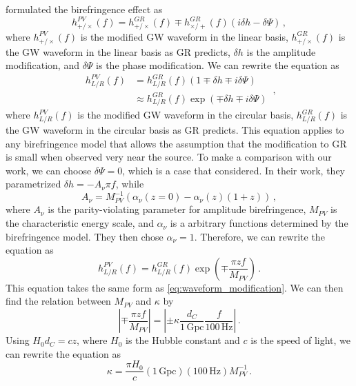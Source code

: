 \documentclass[aps,prd,twocolumn,superscriptaddress,preprintnumbers,floatfix,nofootinbib]{revtex4-2}
\begin{document}
\citet{Wang_2021} formulated the birefringence effect as
\begin{equation}
    h_{+/\times}^{PV}(f) = h_{+/\times}^{GR}(f)\mp h_{\times/+}^{GR}(f)(i\delta h-\delta\Psi)\,,
\end{equation}
where $h_{+/\times}^{PV}(f)$ is the modified \ac{GW} waveform in the linear basis, $h_{+/\times}^{GR}(f)$ is the \ac{GW} waveform in the linear basis as \ac{GR} predicts, $\delta h$ is the amplitude modification, and $\delta\Psi$ is the phase modification.
We can rewrite the equation as
\begin{equation}
\begin{split}
    h_{L/R}^{PV}(f)&=h_{L/R}^{GR}(f)(1\mp\delta h\mp i\delta\Psi)\\
    &\approx h_{L/R}^{GR}(f)\exp\left(\mp\delta h\mp i\delta\Psi\right)
\end{split}
\,,
\end{equation}
where $h_{L/R}^{PV}(f)$ is the modified \ac{GW} waveform in the circular basis, $h_{L/R}^{GR}(f)$ is the \ac{GW} waveform in the circular basis as \ac{GR} predicts.
This equation applies to any birefringence model that allows the assumption that the modification to \ac{GR} is small when observed very near the source.
To make a comparison with our work, we can choose $\delta\Psi=0$, which is a case that \citet{Wang_2021} considered.
In their work, they parametrized $\delta h=-A_\nu\pi f$, while
\begin{equation}
    A_\nu=M_{PV}^{-1}(\alpha_\nu(z=0)-\alpha_\nu(z)(1+z))\,,
\end{equation}
where $A_\nu$ is the parity-violating parameter for amplitude birefringence, $M_{PV}$ is the characteristic energy scale, and $\alpha_\nu$ is a arbitrary functions determined by the birefringence model.
They then chose $\alpha_\nu=1$.
Therefore, we can rewrite the equation as
\begin{equation}
    h_{L/R}^{PV}(f)= h_{L/R}^{GR}(f)\exp\left(\mp\frac{\pi zf}{M_{PV}}\right)\,.
\end{equation}
This equation takes the same form as \eqref{eq:waveform_modification}.
We can then find the relation between $M_{PV}$ and $\kappa$ by
\begin{equation}
    \left|\mp\frac{\pi zf}{M_{PV}}\right|=\left|\pm\kappa\frac{d_C}{1\,\mathrm{Gpc}}\frac{f}{100\,\mathrm{Hz}}\right|\,.
\end{equation}
Using $H_0d_C=cz$, where $H_0$ is the Hubble constant and $c$ is the speed of light, we can rewrite the equation as
\begin{equation}
    \kappa=\frac{\pi H_0}{c}\left(1\,\mathrm{Gpc}\right)\left(100\,\mathrm{Hz}\right)M_{PV}^{-1}\,.
\end{equation}
\end{document}
